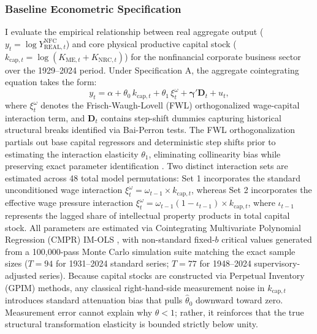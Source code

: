 \subsubsection{Baseline Econometric Specification}
I evaluate the empirical relationship between real aggregate output ($y_t = \log Y_{\text{REAL},t}^{\text{NFC}}$) and core physical productive capital stock ($k_{\text{cap},t} = \log(K_{\text{ME},t} + K_{\text{NRC},t})$) for the nonfinancial corporate business sector over the 1929--2024 period. Under Specification A, the aggregate cointegrating equation takes the form:
\begin{equation}
	y_t = \alpha + \theta_0\, k_{\text{cap},t} + \theta_1\, \xi^{\omega}_t + \boldsymbol{\gamma}' \mathbf{D}_t + u_t,
	\label{eq:431:specA_model}
\end{equation}
where $\xi^{\omega}_t$ denotes the Frisch-Waugh-Lovell (FWL) orthogonalized wage-capital interaction term, and $\mathbf{D}_t$ contains step-shift dummies capturing historical structural breaks identified via Bai-Perron tests. The FWL orthogonalization partials out base capital regressors and deterministic step shifts prior to estimating the interaction elasticity $\theta_1$, eliminating collinearity bias while preserving exact parameter identification \citep{VogelsangWagner2024}. Two distinct interaction sets are estimated across 48 total model permutations: Set 1 incorporates the standard unconditioned wage interaction $\xi^{\omega}_t = \omega_{t-1} \times k_{\text{cap},t}$, whereas Set 2 incorporates the effective wage pressure interaction $\xi^{\omega}_t = \omega_{t-1}(1 - \iota_{t-1}) \times k_{\text{cap},t}$, where $\iota_{t-1}$ represents the lagged share of intellectual property products in total capital stock. All parameters are estimated via Cointegrating Multivariate Polynomial Regression (CMPR) IM-OLS \citep{VogelsangWagner2024}, with non-standard fixed-$b$ critical values generated from a 100,000-pass Monte Carlo simulation suite matching the exact sample sizes ($T = 94$ for 1931--2024 standard series; $T = 77$ for 1948--2024 supervisory-adjusted series). Because capital stocks are constructed via Perpetual Inventory (GPIM) methods, any classical right-hand-side measurement noise in $k_{\text{cap},t}$ introduces standard attenuation bias that pulls $\hat{\theta}_0$ downward toward zero. Measurement error cannot explain why $\theta < 1$; rather, it reinforces that the true structural transformation elasticity is bounded strictly below unity.

